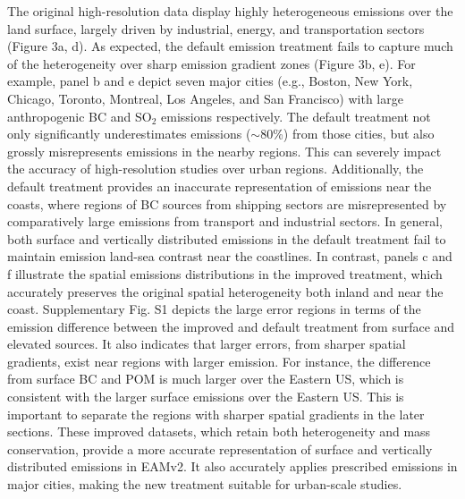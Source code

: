 The original high-resolution data display highly heterogeneous emissions over the land surface, largely driven by industrial, energy, and transportation sectors (Figure 3a, d). As expected, the default emission treatment fails to capture much of the heterogeneity over sharp emission gradient zones (Figure 3b, e). For example, panel b and e depict seven major cities (e.g., Boston, New York, Chicago, Toronto, Montreal, Los Angeles, and San Francisco) with large anthropogenic BC and SO$_2$ emissions respectively. The default treatment not only significantly underestimates emissions ($\sim$80\%) from those cities, but also grossly misrepresents emissions in the nearby regions. This can severely impact the accuracy of high-resolution studies over urban regions. Additionally, the default treatment provides an inaccurate representation of emissions near the coasts, where regions of BC sources from shipping sectors are misrepresented by comparatively large emissions from transport and industrial sectors. In general, both surface and vertically distributed emissions in the default treatment fail to maintain emission land-sea contrast near the coastlines. In contrast, panels c and f illustrate the spatial emissions distributions in the improved treatment, which accurately preserves the original spatial heterogeneity both inland and near the coast. Supplementary Fig. S1 depicts the large error regions in terms of the emission difference between the improved and default treatment from surface and elevated sources. It also indicates that larger errors, from sharper spatial gradients, exist near regions with larger emission. For instance, the difference from surface BC and POM is much larger over the Eastern US, which is consistent with the larger surface emissions over the Eastern US. This is important to separate the regions with sharper spatial gradients in the later sections. These improved datasets, which retain both heterogeneity and mass conservation, provide a more accurate representation of surface and vertically distributed emissions in EAMv2. It also accurately applies prescribed emissions in major cities, making the new treatment suitable for urban-scale studies.

